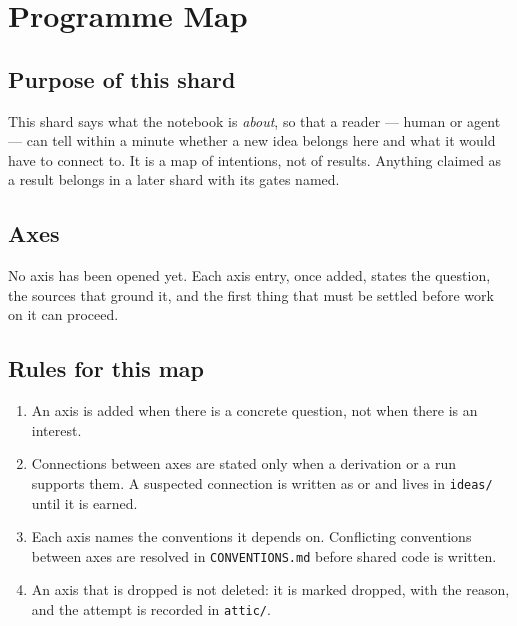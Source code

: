 
\section{Programme Map}
\label{sec:programme-map}

\subsection*{Purpose of this shard}

This shard says what the notebook is \emph{about}, so that a reader --- human or agent --- can tell
within a minute whether a new idea belongs here and what it would have to connect to. It is a map
of intentions, not of results. Anything claimed as a result belongs in a later shard with its gates
named.

\subsection*{Axes}

 No axis has been opened yet. Each axis entry, once added, states the question, the
sources that ground it, and the first thing that must be settled before work on it can proceed.

\subsection*{Rules for this map}

\begin{enumerate}
  \item An axis is added when there is a concrete question, not when there is an interest.
  \item Connections between axes are stated only when a derivation or a run supports them. A
        suspected connection is written as \evI{} or \evQ{} and lives in \texttt{ideas/} until it
        is earned.
  \item Each axis names the conventions it depends on. Conflicting conventions between axes are
        resolved in \texttt{CONVENTIONS.md} before shared code is written.
  \item An axis that is dropped is not deleted: it is marked dropped, with the reason, and the
        attempt is recorded in \texttt{attic/}.
\end{enumerate}

